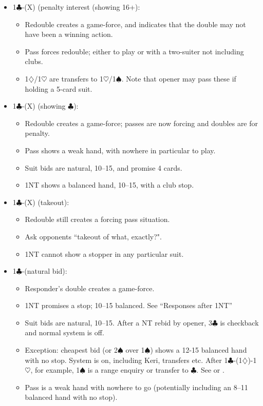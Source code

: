 \documentclass[a4paper,14pt]{extarticle}
\begin{document}
\begin{itemize}
\item 1$\clubsuit$-(X) (penalty interest (showing 16+):
	\begin{itemize}
   \item Redouble creates a game-force, and indicates that the double may not have been 
      a winning action.
   \item Pass forces redouble; either to play or with a two-suiter not including clubs.
   \item 1$\diamondsuit$/1$\heartsuit$ are transfers to 1$\heartsuit$/1$\spadesuit$.  Note that opener may pass these if holding a 5-card 
      suit.
	\end{itemize}
\item 1$\clubsuit$-(X) (showing $\clubsuit$):
	\begin{itemize}
   \item Redouble creates a game-force; passes are now forcing and doubles are for penalty.
   \item Pass shows a weak hand, with nowhere in particular to play.
   \item Suit bids are natural, 10--15, and promise 4 cards.
   \item 1NT shows a balanced hand, 10--15, with a club stop.
	\end{itemize}
\item 1$\clubsuit$-(X) (takeout):
	\begin{itemize}
   \item Redouble still creates a forcing pass situation.
   \item Ask opponents ``takeout of what, exactly?".
   \item 1NT cannot show a stopper in any particular suit.
	\end{itemize}
\item 1$\clubsuit$-(natural bid):
	\begin{itemize}
   \item Responder's double creates a game-force.
   \item 1NT promises a stop; 10--15 balanced. See ``Responses after 1NT'' 
   \item Suit bids are natural, 10--15. After a NT rebid by opener, 3$\clubsuit$ is checkback and normal system is off. 
   \item Exception: cheapest bid (or 2$\spadesuit$ over 1$\spadesuit$) shows a 12-15 balanced hand with no stop.  System is on, including Keri, transfers etc.  After 1$\clubsuit$-(1$\diamondsuit$)-1$\heartsuit$, for example, 1$\spadesuit$ is a range enquiry or transfer to $\clubsuit$. See  or .
   \item Pass is a weak hand with nowhere to go (potentially including an 8--11 balanced hand with no stop).
	\end{itemize}
\end{itemize}
\end{document}
